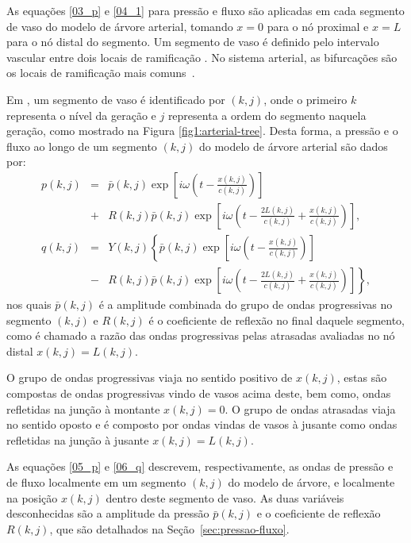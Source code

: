 \documentclass[
        english,			
        brazil			        %
        ,<...>]{abntbibufjf}
\begin{document}
As equações \eqref{03_p} e \eqref{04_1} para pressão e fluxo são aplicadas em cada segmento de vaso do modelo de árvore arterial, tomando $x = 0$ para o nó proximal e $x = L$ para o nó distal do segmento. Um segmento de vaso é definido pelo intervalo vascular entre dois locais de ramificação \cite{Zamir3}. No sistema arterial, as bifurcações são os locais de ramificação mais comuns~\cite{Zamir1}.

Em \cite{Duan}, um segmento de vaso é identificado por $(k,j)$, onde o primeiro $k$ representa o nível da geração e $j$ representa a ordem do segmento naquela geração, como mostrado na Figura \ref{fig1:arterial-tree}. Desta forma, a pressão e o fluxo ao longo de um segmento  $(k,j)$ do modelo de árvore arterial são dados por:
\begin{eqnarray}
p(k,j) &=& \bar{p}(k,j) \exp\left[i\omega\left(t - \frac{x(k,j)}{c(k,j)}\right)\right] \nonumber \\
&+& R(k,j)  \bar{p}(k,j) \exp\left[i\omega\left(t - \frac{2L(k,j)}{c(k,j)} + \frac{x(k,j)}{c(k,j)}\right)\right],
\label{05_p}\\
q (k,j) &=& Y(k,j)\left\{\bar{p}(k,j) \exp\left[i\omega\left(t - \frac{x(k,j)}{c(k,j)}\right)\right]\right. \nonumber \\
&-& \left. R(k,j)  \bar{p}(k,j) \exp\left[i\omega\left(t - \frac{2L(k,j)}{c(k,j)} + \frac{x(k,j)}{c(k,j)}\right)\right]\right\},
\label{06_q}
\end{eqnarray}
nos quais $\bar{p}(k,j)$ é a amplitude combinada do grupo de ondas progressivas no segmento $(k,j)$ e $R(k,j)$ é o coeficiente de reflexão no final daquele segmento, como é chamado a razão das ondas progressivas pelas atrasadas avaliadas no nó distal $x(k,j) = L(k,j)$. 

O grupo de ondas progressivas viaja no sentido positivo de $x(k,j)$, estas são compostas de ondas progressivas vindo de vasos acima deste, bem como, ondas refletidas na junção à montante $x(k,j) = 0$. O grupo de ondas atrasadas viaja no sentido oposto e é composto por ondas vindas de vasos à jusante como ondas refletidas na junção à jusante $x(k,j) = L(k,j)$. 

As equações \eqref{05_p} e \eqref{06_q} descrevem, respectivamente, as ondas de pressão e de fluxo localmente em um segmento $(k,j)$ do modelo de árvore, e localmente na posição $x(k,j)$ dentro deste segmento de vaso. As duas variáveis desconhecidas são a amplitude da pressão  $\bar{p} (k,j)$ e o coeficiente de reflexão $R (k,j)$, que são detalhados na Seção~\ref{sec:pressao-fluxo}. 
\end{document}
